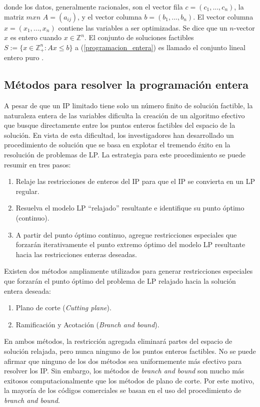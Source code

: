 donde los datos, generalmente racionales, son el vector fila $c = (c_1,...,c_n)$, la matriz $mxn$ $A=(a_{ij})$, y el vector columna $b=(b_1,..., b_n)$. El vector columna $x=(x_1,...,x_n)$ contiene las variables a ser optimizadas. Se dice que un $n$-vector $x$ es entero cuando $x \in \mathbb{Z}^n$. El conjunto de soluciones factibles $S := \{x \in \mathbb{Z}^n_+ : Ax \leq b\}$ a (\ref{programacion_entera}) es llamado el conjunto lineal entero puro \citep{ConfortiIntegerProgramming}.

\subsection{Métodos para resolver la programación entera}

A pesar de que un IP limitado tiene solo un número finito de solución factible, la naturaleza entera de las variables dificulta la creación de un algoritmo efectivo que busque directamente entre los puntos enteros factibles del espacio de la solución. En vista de esta dificultad, los investigadores han desarrollado un procedimiento de solución que se basa en explotar el tremendo éxito en la resolución de problemas de LP. La estrategia para este procedimiento se puede resumir en tres pasos:

\begin{enumerate}
    \item Relaje las restricciones de enteros del IP para que el IP se convierta en un LP regular.
    \item Resuelva el modelo LP ``relajado'' resultante e identifique su punto óptimo (continuo).
    \item A partir del punto óptimo continuo, agregue restricciones especiales que forzarán iterativamente el punto extremo óptimo del modelo LP resultante hacia las restricciones enteras deseadas.
\end{enumerate}

Existen dos métodos ampliamente utilizados para generar restricciones especiales que forzarán el punto óptimo del problema de LP relajado hacia la solución entera deseada:

\begin{enumerate}
\item Plano de corte (\textit{Cutting plane}).
\item  Ramificación y Acotación (\textit{Branch and bound}).
\end{enumerate}

En ambos métodos, la restricción agregada eliminará partes del espacio de solución relajada, pero nunca ninguno de los puntos enteros factibles. No se puede afirmar que ninguno de los dos métodos sea uniformemente más efectivo para resolver los IP. Sin embargo, los métodos de \textit{branch and bound} son mucho más exitosos computacionalmente que los métodos de plano de corte. Por este motivo, la mayoría de los códigos comerciales se basan en el uso del procedimiento de \textit{branch and bound}.

